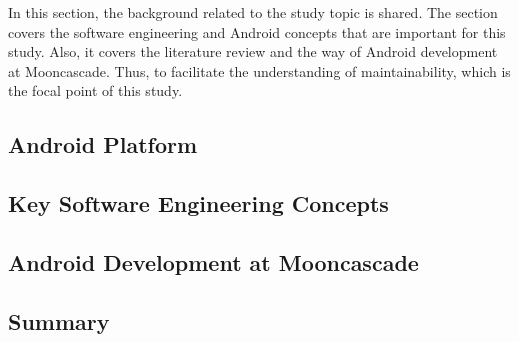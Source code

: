 In this section, the background related to the study topic is shared. The section covers the software engineering and Android concepts that are important for this study. Also, it covers the literature review and the way of Android development at Mooncascade. Thus, to facilitate the understanding of maintainability, which is the focal point of this study.

\subsection{Android Platform}


\subsection{Key Software Engineering Concepts}


\subsection{Android Development at Mooncascade}
\label{section:2.3}


\subsection{Summary}




